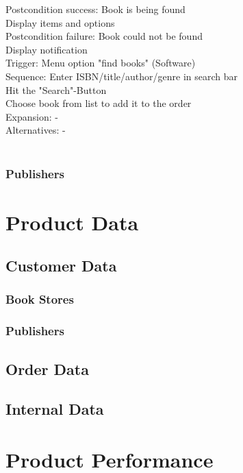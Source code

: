 \documentclass[11pt,a4paper,oneside,svgnames]{report}
\begin{document}
\begin{tabbing}
	 Postcondition success: \> Book is being found\\
	 \> Display items and options\\
	 Postcondition failure: \> Book could not be found\\
	 \> Display notification\\
	 Trigger: \> Menu option "find books" (Software)\\
	 Sequence: \> Enter ISBN/title/author/genre in search bar\\
	 \> Hit the "Search"-Button\\
	 \> Choose book from list to add it to the order\\
	 Expansion: \> -\\
	 Alternatives: \> -\\
	 \\
\end{tabbing} 
\clearpage

\subsection{Publishers}

\chapter{Product Data}
\section{Customer Data}
\subsection{Book Stores}
\subsection{Publishers}
\section{Order Data}
\section{Internal Data}

\chapter{Product Performance}
\end{document}

